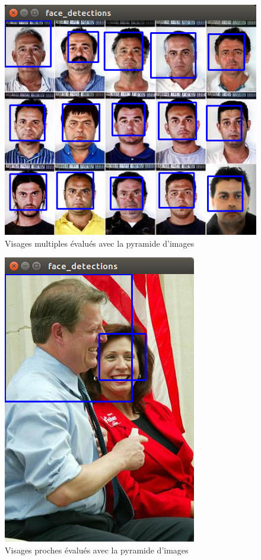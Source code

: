 \documentclass[a4paper,11pt]{article}
\begin{document}
	\begin{figure}[H]
	    \centering
	    \includegraphics[scale=0.3]{first_scale.png}
	    \caption{Visages multiples évalués avec la pyramide d'images}
	    \label{fig:first_scale}
	\end{figure}
	\begin{figure}[H]
	    \centering
	    \includegraphics[scale=0.3]{scale_2.png}
	    \caption{Visages proches évalués avec la pyramide d'images}
	    \label{fig:scale_2}
	\end{figure}
\end{document}
